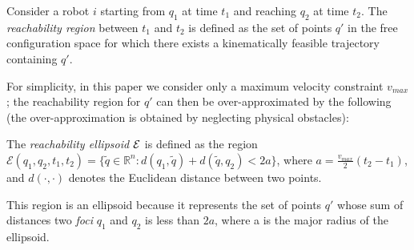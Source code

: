 \documentclass[10pt,twocolumn,twoside]{IEEEtran}
\newcommand{\new}[1]{\textcolor{blue}{#1}}
\newcommand{\news}{\color{blue}}
\begin{document}
{\news
\begin{definition}\label{sec:ellipsoidal definition}
Consider a robot $i$ starting from $q_{1}$ at time $t_1$ and reaching $q_{2}$ at time $t_2$. The \emph{reachability region} between $t_1$ and $t_2$ is defined as the set of points $q'$ in the free configuration space for which there exists a kinematically feasible trajectory containing $q'$.
\end{definition}

For simplicity, in this paper we consider only a maximum velocity constraint $v_{max}$; the reachability region for $q'$ can then be over-approximated by the following (the over-approximation is obtained by neglecting physical obstacles):%
\begin{definition}\label{def:Reachability}
	The \emph{reachability ellipsoid $\mathcal{E}$} is defined as the region $\mathcal{E}(q_1,q_2,t_{1},t_{2})=\{\tilde{q}\in\mathbb{R}^n: d(q_1,\tilde{q})+d(\tilde{q},q_2)<2a\}$, where $a=\frac{v_{max}}{2}(t_2-t_1)$, and $d(\cdot,\cdot)$ denotes the Euclidean distance between two points.
\end{definition}
This region is an ellipsoid because it represents the set of points $q'$ whose sum of distances two \emph{foci} $q_1$ and $q_2$ is less than $2a$, where a is the major radius of the ellipsoid. }
\end{document}
